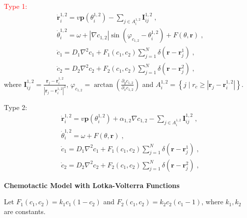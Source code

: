 \documentclass{article}
\begin{document}
\noindent\textcolor{red}{Type 1:}
\begin{subequations}
    \begin{align}
        &\dot{\mathbf{r}}_{i}^{1,2}=v\mathbf{p}\left( \theta _{i}^{1,2} \right) -\sum_{j\in A_{i}^{1,2}}{\mathbf{I}_{ij}^{1,2}\;,}\\
        &\dot{\theta}_{i}^{1,2}=\omega + \left| \nabla c_{1,2} \right|\sin \left( \varphi _{c_{1,2}}-\theta _{i}^{1,2} \right) +F\left( \theta ,\mathbf{r} \right) \;,\\
        &\dot{c}_1=D_1\nabla ^2c_1+F_1\left( c_1,c_2 \right) \sum_{j=1}^N{\delta \left( \mathbf{r}-\mathbf{r}_{j}^{1} \right) \;,}\\
        &\dot{c}_2=D_2\nabla ^2c_2+F_2\left( c_1,c_2 \right) \sum_{j=1}^N{\delta \left( \mathbf{r}-\mathbf{r}_{j}^{2} \right) \;,}
    \end{align}
\end{subequations}
where $\mathbf{I}_{ij}^{1,2}=\frac{\mathbf{r}_j-\mathbf{r}_{i}^{1,2}}{|\mathbf{r}_j-\mathbf{r}_{i}^{1,2}|^{2}}$, $\varphi _{c_{1,2}}=\arctan \left( \frac{\partial _yc_{1,2}}{\partial _xc_{1,2}} \right) $ and $A_{i}^{1,2}=\left\{ j\mid r_c\geqslant | \mathbf{r}_j-\mathbf{r}_{i}^{1,2} | \right\}$.

\noindent Type 2:
\begin{subequations}
    \begin{align}
        &\dot{\mathbf{r}}_{i}^{1,2}=v\mathbf{p}\left( \theta _{i}^{1,2} \right) +\alpha _{1,2}\nabla c_{1,2}-\sum_{j\in A_{i}^{1,2}}{\mathbf{I}_{ij}^{1,2}\;,}\\
        &\dot{\theta}_{i}^{1,2}=\omega + F\left( \theta ,\mathbf{r} \right) \;,\\
        &\dot{c}_1=D_1\nabla ^2c_1+F_1\left( c_1,c_2 \right) \sum_{j=1}^N{\delta \left( \mathbf{r}-\mathbf{r}_{j}^{1} \right) \;,}\\
        &\dot{c}_2=D_2\nabla ^2c_2+F_2\left( c_1,c_2 \right) \sum_{j=1}^N{\delta \left( \mathbf{r}-\mathbf{r}_{j}^{2} \right) \;,}
    \end{align}
\end{subequations}

\noindent\textbf{Chemotactic Model with Lotka-Volterra Functions}

Let $F_1\left( c_1,c_2 \right)=k_1c_1\left( 1-c_2 \right)$ and $F_2\left( c_1,c_2 \right)=k_2c_2\left( c_1-1 \right)$, where $k_1,k_2$ are constants.
\end{document}
